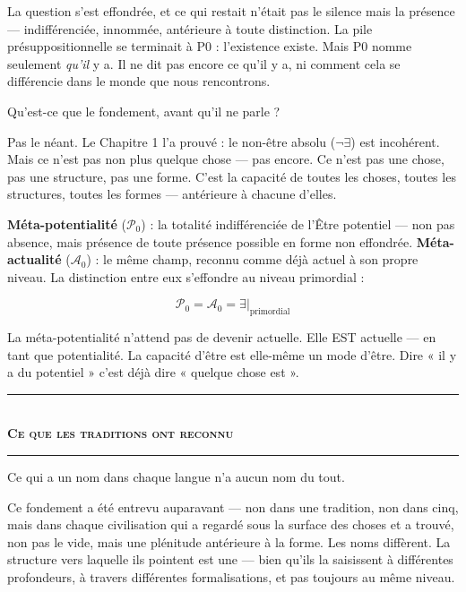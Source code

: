 \documentclass[10pt, openany, oneside]{book}
\renewcommand{\normalsize}{\fontsize{10}{13}\selectfont}
\begin{document}
La question s'est effondrée, et ce qui restait n'était pas le silence mais la présence --- indifférenciée, innommée, antérieure à toute distinction. La pile présuppositionnelle se terminait à P0 : l'existence existe. Mais P0 nomme seulement \textit{qu'il} y a. Il ne dit pas encore ce qu'il y a, ni comment cela se différencie dans le monde que nous rencontrons.

Qu'est-ce que le fondement, avant qu'il ne parle ?

Pas le néant. Le Chapitre 1 l'a prouvé : le non-être absolu ($\neg\exists$) est incohérent. Mais ce n'est pas non plus quelque chose --- pas encore. Ce n'est pas une chose, pas une structure, pas une forme. C'est la capacité de toutes les choses, toutes les structures, toutes les formes --- antérieure à chacune d'elles.

\textbf{Méta-potentialité} ($\mathcal{P}_0$) : la totalité indifférenciée de l'Être potentiel --- non pas absence, mais présence de toute présence possible en forme non effondrée. \textbf{Méta-actualité} ($\mathcal{A}_0$) : le même champ, reconnu comme déjà actuel à son propre niveau. La distinction entre eux s'effondre au niveau primordial :

$$\mathcal{P}_0 = \mathcal{A}_0 = \exists|_{\text{primordial}}$$

La méta-potentialité n'attend pas de devenir actuelle. Elle EST actuelle --- en tant que potentialité. La capacité d'être est elle-même un mode d'être. Dire « il y a du potentiel » c'est déjà dire « quelque chose est ».

\vspace{1.5em}


\begin{center}
    \rule{0.3\textwidth}{0.4pt}\\[0.5em]
    {\normalsize\bfseries\scshape Ce que les traditions ont reconnu}\\[0.3em]
    \rule{0.3\textwidth}{0.4pt}
\end{center}

\vspace{1em}

\noindent Ce qui a un nom dans chaque langue n'a aucun nom du tout.

Ce fondement a été entrevu auparavant --- non dans une tradition, non dans cinq, mais dans chaque civilisation qui a regardé sous la surface des choses et a trouvé, non pas le vide, mais une plénitude antérieure à la forme. Les noms diffèrent. La structure vers laquelle ils pointent est une --- bien qu'ils la saisissent à différentes profondeurs, à travers différentes formalisations, et pas toujours au même niveau.
\end{document}
